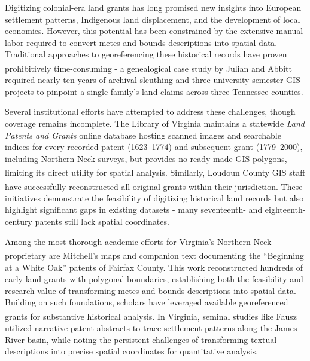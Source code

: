 \documentclass[
  10pt]{article}
\begin{document}
Digitizing colonial-era land grants has long promised new insights into
European settlement patterns, Indigenous land displacement, and the
development of local economies. However, this potential has been
constrained by the extensive manual labor required to convert
metes-and-bounds descriptions into spatial data. Traditional approaches
to georeferencing these historical records have proven prohibitively
time-consuming - a genealogical case study by Julian and
Abbitt\textsuperscript{} required
nearly ten years of archival sleuthing and three university-semester GIS
projects to pinpoint a single family's land claims across three
Tennessee counties.

Several institutional efforts have attempted to address these
challenges, though coverage remains incomplete. The Library of Virginia
maintains a statewide \emph{Land Patents and Grants} online database
hosting scanned images and searchable indices for every recorded patent
(1623--1774) and subsequent grant (1779--2000), including Northern Neck
surveys, but provides no ready-made GIS polygons, limiting its direct
utility for spatial
analysis\textsuperscript{}. Similarly,
Loudoun County GIS staff have successfully reconstructed all original
grants within their
jurisdiction\textsuperscript{}.
These initiatives demonstrate the feasibility of digitizing historical
land records but also highlight significant gaps in existing datasets -
many seventeenth- and eighteenth-century patents still lack spatial
coordinates.

Among the most thorough academic efforts for Virginia's Northern Neck
proprietary are
Mitchell's\textsuperscript{} maps
and companion text documenting the ``Beginning at a White Oak'' patents
of Fairfax County. This work reconstructed hundreds of early land grants
with polygonal boundaries, establishing both the feasibility and
research value of transforming metes-and-bounds descriptions into
spatial data. Building on such foundations, scholars have leveraged
available georeferenced grants for substantive historical analysis. In
Virginia, seminal studies like
Fausz\textsuperscript{} utilized
narrative patent abstracts to trace settlement patterns along the James
River basin, while noting the persistent challenges of transforming
textual descriptions into precise spatial coordinates for quantitative
analysis.
\end{document}
